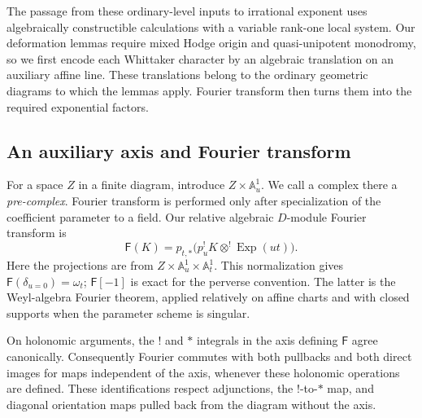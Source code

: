 The passage from these ordinary-level inputs to irrational exponent uses
algebraically constructible calculations with a variable rank-one local
system.  Our deformation lemmas require mixed Hodge origin and
quasi-unipotent monodromy, so we first encode each Whittaker character by
an algebraic translation on an auxiliary affine line.  These translations
belong to the ordinary geometric diagrams to which the lemmas apply.
Fourier transform then turns them into the required exponential factors.

\subsection{An auxiliary axis and Fourier transform}

For a space $Z$ in a finite diagram, introduce $Z\times\mathbb A^1_u$.
We call a complex there a \emph{pre-complex}.  Fourier transform is
performed only after specialization of the coefficient parameter to a
field.  Our relative algebraic $D$-module Fourier transform is
\[
 \mathsf F(K)=p_{t,*}\bigl(p_u^!K\mathbin{\otimes^!}
                                      \operatorname{Exp}(ut)\bigr).
\]
Here the projections are from $Z\times\mathbb A^1_u\times\mathbb A^1_t$.
This normalization gives $\mathsf F(\delta_{u=0})=\omega_t$;
$\mathsf F[-1]$ is exact for the perverse convention.  The latter is
the Weyl-algebra Fourier theorem, applied relatively on affine charts
and with closed supports when the parameter scheme is singular.

\begin{lemma}\label{deform:fourier}
On holonomic arguments, the $!$ and $*$ integrals in the axis defining
$\mathsf F$ agree canonically.  Consequently Fourier commutes with
both pullbacks and both direct images for maps independent of the
axis, whenever these holonomic operations are defined.  These
identifications respect adjunctions, the $!$-to-$*$ map, and diagonal
orientation maps pulled back from the diagram without the axis.
\end{lemma}

